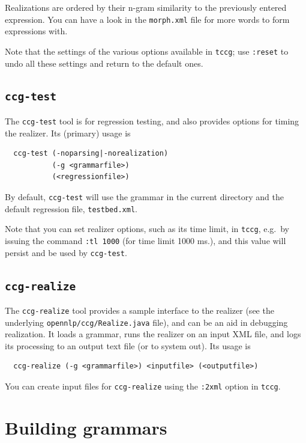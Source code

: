 \documentclass[11pt]{article}
\begin{document}
\noindent Realizations are ordered by their n-gram similarity to the
previously entered expression. You can have a look in the
\texttt{morph.xml} file for more words to form expressions with.

Note that the settings of the various options available in
\texttt{tccg}; use \texttt{:reset} to undo all these settings and return
to the default ones.

\subsection{\texttt{ccg-test}}

The \texttt{ccg-test} tool is for regression testing, and also provides
options for timing the realizer. Its (primary) usage is

\begin{verbatim}
  ccg-test (-noparsing|-norealization) 
           (-g <grammarfile>) 
           (<regressionfile>)
\end{verbatim}

By default, \texttt{ccg-test} will use the grammar in the current
directory and the default regression file, \texttt{testbed.xml}.

Note that you can set realizer options, such as its time limit, in
\texttt{tccg}, e.g.\ by issuing the command \texttt{:tl 1000} (for time
limit 1000 ms.), and this value will persist and be used by
\texttt{ccg-test}.

\subsection{\texttt{ccg-realize}}

The \texttt{ccg-realize} tool provides a sample interface to the
realizer (see the underlying \texttt{opennlp/ccg/Realize.java} file),
and can be an aid in debugging realization. It loads a grammar, runs the
realizer on an input XML file, and logs its processing to an output text
file (or to system out). Its usage is

\begin{verbatim}
  ccg-realize (-g <grammarfile>) <inputfile> (<outputfile>)
\end{verbatim}
  
You can create input files for \texttt{ccg-realize} using the
\texttt{:2xml} option in \texttt{tccg}.

\section{Building grammars}
\end{document}
